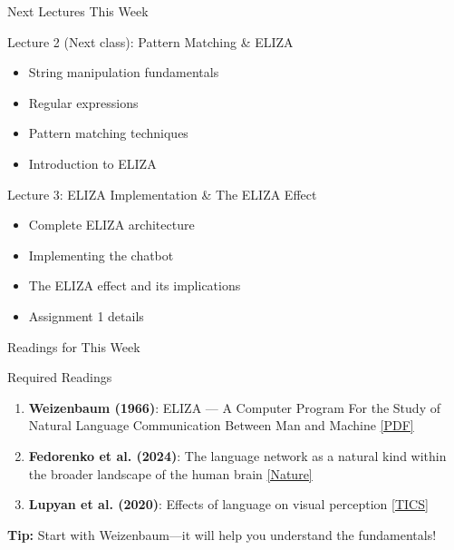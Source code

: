 \documentclass[aspectratio=169]{beamer}
\begin{document}
\begin{frame}[shrink=5]{Next Lectures This Week 🔮}
\small
\begin{block}{Lecture 2 (Next class): Pattern Matching \& ELIZA}
\begin{itemize}\setlength{\itemsep}{0pt}\setlength{\itemsep}{0pt}
    \item String manipulation fundamentals
    \item Regular expressions
    \item Pattern matching techniques
    \item Introduction to ELIZA
\end{itemize}
\end{block}

\vspace{0.2cm}

\begin{block}{Lecture 3: ELIZA Implementation \& The ELIZA Effect}
\begin{itemize}\setlength{\itemsep}{0pt}\setlength{\itemsep}{0pt}
    \item Complete ELIZA architecture
    \item Implementing the chatbot
    \item The ELIZA effect and its implications
    \item Assignment 1 details
\end{itemize}
\end{block}
\end{frame}

\begin{frame}[shrink=5]{Readings for This Week 📖}
\small
\begin{block}{Required Readings}
\begin{enumerate}\setlength{\itemsep}{0pt}\setlength{\itemsep}{0pt}
    \item \textbf{Weizenbaum (1966)}: ELIZA — A Computer Program For the Study of Natural Language Communication Between Man and Machine
    \href{https://web.stanford.edu/class/cs124/p36-weizenabaum.pdf}{[PDF]}

    \item \textbf{Fedorenko et al. (2024)}: The language network as a natural kind within the broader landscape of the human brain
    \href{https://www.nature.com/articles/s41586-024-07522-w}{[Nature]}

    \item \textbf{Lupyan et al. (2020)}: Effects of language on visual perception
    \href{https://doi.org/10.1016/j.tics.2020.08.005}{[TICS]}
\end{enumerate}
\end{block}

\vspace{0.2cm}

\textbf{Tip:} Start with Weizenbaum—it will help you understand the fundamentals!
\end{frame}
\end{document}
